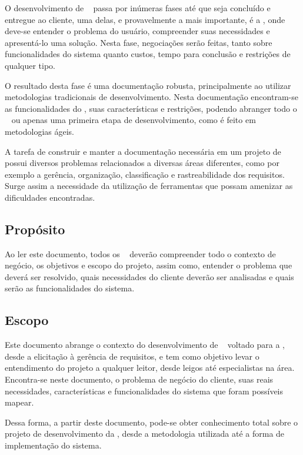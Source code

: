 
O desenvolvimento de \sw~ passa por inúmeras fases até que seja concluído e entregue ao cliente, uma delas, e provavelmente a mais importante, é a \er, onde deve-se entender o problema do usuário, compreender suas necessidades e apresentá-lo uma solução. Nesta fase, negociações serão feitas, tanto sobre funcionalidades do sistema quanto custos, tempo para conclusão e restrições de qualquer tipo.

O resultado desta fase é uma documentação robusta, principalmente ao utilizar metodologias tradicionais de desenvolvimento. Nesta documentação encontram-se as funcionalidades do \sw, suas características e restrições, podendo abranger todo o \sw~ ou apenas uma primeira etapa de desenvolvimento, como é feito em metodologias ágeis.

A tarefa de construir e manter a documentação necessária em um projeto de \sw~ possui diversos problemas relacionados a diversas áreas diferentes, como por exemplo a gerência, organização, classificação e rastreabilidade dos requisitos. Surge assim a necessidade da utilização de ferramentas que possam amenizar as dificuldades encontradas.

\subsection{Propósito}

Ao ler este documento, todos os \stakeholder~ deverão compreender todo o contexto de negócio, os objetivos e escopo do projeto, assim como, entender o problema que deverá ser resolvido, quais necessidades do cliente deverão ser analisadas e quais serão as funcionalidades do sistema.

\subsection{Escopo}

Este documento abrange o contexto do desenvolvimento de \sw~ voltado para a \er, desde a elicitação à gerência de requisitos, e tem como objetivo levar o entendimento do projeto a qualquer leitor, desde leigos até especialistas na área. Encontra-se neste documento, o problema de negócio do cliente, suas reais necessidades, características e funcionalidades do sistema que foram possíveis mapear.

Dessa forma, a partir deste documento, pode-se obter conhecimento total sobre o projeto de desenvolvimento da \nomeferramenta, desde a metodologia utilizada até a forma de implementação do sistema.

